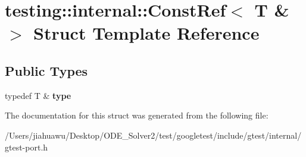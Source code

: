 \hypertarget{structtesting_1_1internal_1_1_const_ref_3_01_t_01_6_01_4}{}\section{testing\+:\+:internal\+:\+:Const\+Ref$<$ T \& $>$ Struct Template Reference}
\label{structtesting_1_1internal_1_1_const_ref_3_01_t_01_6_01_4}
\subsection*{Public Types}
\begin{DoxyCompactItemize}
\item 
\mbox{\label{structtesting_1_1internal_1_1_const_ref_3_01_t_01_6_01_4_a9f664dd25649a0d260cfb1f610c7a349}} 
typedef T \& {\bfseries type}
\end{DoxyCompactItemize}


The documentation for this struct was generated from the following file\+:\begin{DoxyCompactItemize}
\item 
/\+Users/jiahuawu/\+Desktop/\+O\+D\+E\+\_\+\+Solver2/test/googletest/include/gtest/internal/gtest-\/port.\+h\end{DoxyCompactItemize}

